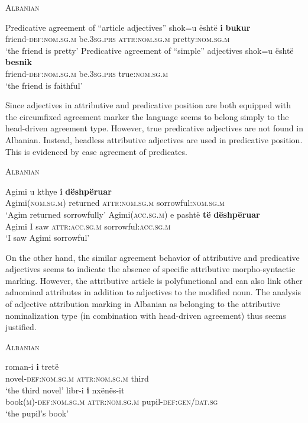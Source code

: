 \begin{exe}
\ex \textsc{Albanian} \citep{demiraj1998}
\begin{xlist}
\ex Predicative agreement of “article adjectives”
\gll	shok=u \"esht\"e \textbf{i} \textbf{bukur}\\
	friend-\textsc{def:nom.sg.m} be\textsc{.3sg.prs} \textsc{attr:nom.sg.m} pretty:\textsc{nom.sg.m}\\
\glt	‘the friend is pretty’
\ex Predicative agreement of “simple” adjectives
\gll	shok=u \"esht\"e \textbf{besnik}\\
	friend-\textsc{def:nom.sg.m} be\textsc{.3sg.prs} true:\textsc{nom.sg.m}\\
\glt	‘the friend is faithful’
\end{xlist}
\end{exe}
Since adjectives in attributive and predicative position are both equipped with the circumfixed agreement marker the language seems to belong simply to the head-driven agreement type. However, true predicative adjectives are not found in Albanian. Instead, headless attributive adjectives are used in predicative position. This is evidenced by case agreement of predicates.
\begin{exe}
\ex \textsc{Albanian} \citep{demiraj1998}
\begin{xlist}
\ex
\gll	Agimi {u kthye} \textbf{i} \textbf{dëshpëruar}\\
	Agimi(\textsc{nom.sg.m}) returned \textsc{attr:nom.sg.m} sorrowful:\textsc{nom.sg.m}\\
\glt	‘Agim returned sorrowfully’
\ex
\gll	Agimi(\textsc{acc.sg.m}) e pashtë \textbf{të} \textbf{dëshpëruar}\\
	Agimi I saw \textsc{attr:acc.sg.m} sorrowful:\textsc{acc.sg.m}\\
\glt	‘I saw Agimi sorrowful’
\end{xlist}
\end{exe}
On the other hand, the similar agreement behavior of attributive and predicative adjectives seems to indicate the absence of specific attributive morpho-syntactic marking. However, the attributive article is polyfunctional and can also link other adnominal attributes in addition to adjectives to the modified noun. The analysis of adjective attribution marking in Albanian as belonging to the attributive nominalization type (in combination with head-driven agreement) thus seems justified.
\begin{exe}
\ex \textsc{Albanian} \citep{demiraj1998}
\begin{xlist}
\ex
\gll	roman-i 			\textbf{i} 			tretë\\
	novel-\textsc{def:nom.sg.m} \textsc{attr:nom.sg.m} third\\
\glt	‘the third novel’
\ex	
\gll	libr-i 	\textbf{i}  nxënës-it\\
	book(\textsc{m})-\textsc{def:nom.sg.m} \textsc{attr:nom.sg.m} pupil-\textsc{def:gen/dat.sg}\\
\glt	‘the pupil's book’
\end{xlist}
\end{exe}

